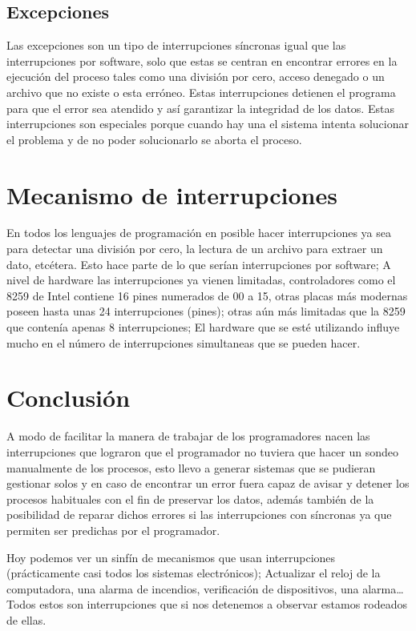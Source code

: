 \documentclass[11pt]{article}
\begin{document}
\subsection{Excepciones}
Las excepciones son un tipo de interrupciones síncronas igual que las interrupciones por software, solo que estas se centran en encontrar errores en la ejecución del proceso tales como una división por cero, acceso denegado o un archivo que no existe o esta erróneo. Estas interrupciones detienen el programa para que el error sea atendido y así garantizar la integridad de los datos. Estas interrupciones son especiales porque cuando hay una el sistema intenta solucionar el problema y de no poder solucionarlo se aborta el proceso.

\section{Mecanismo de interrupciones}
En todos los lenguajes de programación en posible hacer interrupciones ya sea para detectar una división por cero, la lectura de un archivo para extraer un dato, etcétera. Esto hace parte de lo que serían interrupciones por software; A nivel de hardware las interrupciones ya vienen limitadas, controladores como el 8259 de Intel contiene 16 pines numerados de 00 a 15, otras placas más modernas poseen hasta unas 24 interrupciones (pines); otras aún más limitadas que la 8259 que contenía apenas 8 interrupciones; El hardware que se esté utilizando influye mucho en el número de interrupciones simultaneas que se pueden hacer.

\section{Conclusión}
A modo de facilitar la manera de trabajar de los programadores nacen las interrupciones que lograron que el programador no tuviera que hacer un sondeo manualmente de los procesos, esto llevo a generar sistemas que se pudieran gestionar solos y en caso de encontrar un error fuera capaz de avisar y detener los procesos habituales con el fin de preservar los datos, además también de la posibilidad de reparar dichos errores si las interrupciones con síncronas ya que permiten ser predichas por el programador.

Hoy podemos ver un sinfín de mecanismos que usan interrupciones (prácticamente casi todos los sistemas electrónicos); Actualizar el reloj de la computadora, una alarma de incendios, verificación de dispositivos, una alarma… Todos estos son interrupciones que si nos detenemos a observar estamos rodeados de ellas.
\cite{estructura}



\end{document}
